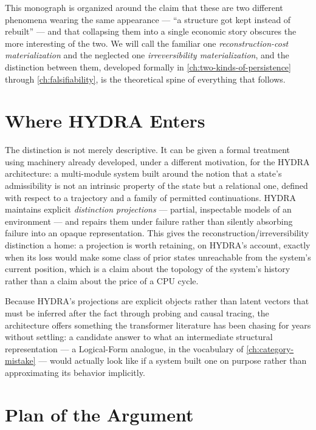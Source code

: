 \documentclass[11pt]{book}
\theoremstyle{plain}
\theoremstyle{definition}
\theoremstyle{remark}
\begin{document}
This monograph is organized around the claim that these are two
different phenomena wearing the same appearance --- \enquote{a
structure got kept instead of rebuilt} --- and that collapsing them
into a single economic story obscures the more interesting of the two.
We will call the familiar one \emph{reconstruction-cost
materialization} and the neglected one \emph{irreversibility
materialization}, and the distinction between them, developed formally
in \cref{ch:two-kinds-of-persistence} through \cref{ch:falsifiability},
is the theoretical spine of everything that follows.

\section{Where HYDRA Enters}

The distinction is not merely descriptive. It can be given a formal
treatment using machinery already developed, under a different
motivation, for the HYDRA architecture: a multi-module system built
around the notion that a state's admissibility is not an intrinsic
property of the state but a relational one, defined with respect to a
trajectory and a family of permitted continuations. HYDRA maintains
explicit \emph{distinction projections} --- partial, inspectable
models of an environment --- and repairs them under failure rather
than silently absorbing failure into an opaque representation. This
gives the reconstruction/irreversibility distinction a home: a
projection is worth retaining, on HYDRA's account, exactly when its
loss would make some class of prior states unreachable from the
system's current position, which is a claim about the topology of the
system's history rather than a claim about the price of a CPU cycle.

Because HYDRA's projections are explicit objects rather than latent
vectors that must be inferred after the fact through probing and
causal tracing, the architecture offers something the transformer
literature has been chasing for years without settling: a candidate
answer to what an intermediate structural representation --- a
Logical-Form analogue, in the vocabulary of \cref{ch:category-mistake}
--- would actually look like if a system built one on purpose rather
than approximating its behavior implicitly.

\section{Plan of the Argument}
\end{document}
